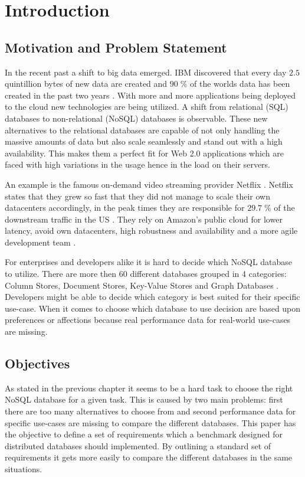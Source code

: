 
\chapter{Introduction}
\label{cha:introduction}

\section{Motivation and Problem Statement}
\label{sec:motivation-and-problem-statement}
In the recent past a shift to big data emerged. IBM discovered that every day $2.5$ quintillion bytes of new data are created and $90\;\%$ of the worlds data has been created in the past two years \cite{ibm.2014}. With more and more applications being deployed to the cloud new technologies are being utilized. A shift from relational (SQL) databases to non-relational (NoSQL) databases is observable. These new alternatives to the relational databases are capable of not only handling the massive amounts of data but also scale seamlessly and stand out with a high availability. This makes them a perfect fit for Web 2.0 applications which are faced with high variations in the usage hence in the load on their servers.

An example is the famous on-demand video streaming provider Netflix \cite{netflix.2014}. Netflix states that they grew so fast that they did not manage to scale their own datacenters accordingly, in the peak times they are responsible for $29.7\;\%$ of the downstream traffic in the US \cite[1]{adhikari.2012}. They rely on Amazon's public cloud for lower latency, avoid own datacenters, high robustness and availability and a more agile development team \cite[24]{netflix.2011}.

For enterprises and developers alike it is hard to decide which NoSQL database to utilize. There are more then 60 different databases grouped in 4 categories: Column Stores, Document Stores, Key-Value Stores and Graph Databases \cite[1 - 2]{tudorica.2011}. Developers might be able to decide which category is best suited for their specific use-case. When it comes to choose which database to use decision are based upon preferences or affections because real performance data for real-world use-cases are missing.

\section{Objectives}
\label{sec:objectives}
As stated in the previous chapter it seems to be a hard task to choose the right NoSQL database for a given task. This is caused by two main problems: first there are too many alternatives to choose from and second performance data for specific use-cases are missing to compare the different databases.
This paper has the objective to define a set of requirements which a benchmark designed for distributed databases should implemented. By outlining a standard set of requirements it gets more easily to compare the different databases in the same situations.

